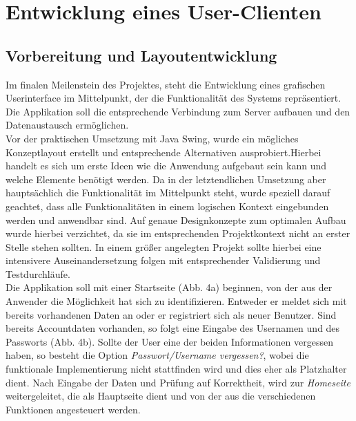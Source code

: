 

\section{Entwicklung eines User-Clienten}

\subsection{Vorbereitung und Layoutentwicklung}
Im finalen Meilenstein des Projektes, steht die Entwicklung eines grafischen Userinterface im Mittelpunkt, der die Funktionalität des Systems repräsentiert. Die Applikation soll die entsprechende Verbindung zum Server aufbauen und den Datenaustausch ermöglichen. \\

Vor der praktischen Umsetzung mit Java Swing, wurde ein mögliches Konzeptlayout erstellt und entsprechende Alternativen ausprobiert.Hierbei handelt es sich um erste Ideen wie die Anwendung aufgebaut sein kann und welche Elemente benötigt werden.
Da in der letztendlichen Umsetzung aber hauptsächlich die Funktionalität im Mittelpunkt steht, wurde speziell darauf geachtet, dass alle Funktionalitäten in einem logischen Kontext eingebunden werden und anwendbar sind. Auf genaue Designkonzepte zum optimalen Aufbau wurde hierbei verzichtet, da sie im entsprechenden Projektkontext nicht an erster Stelle stehen sollten. In einem größer angelegten Projekt sollte hierbei eine intensivere Auseinandersetzung folgen mit entsprechender Validierung und Testdurchläufe. \\

Die Applikation soll mit einer Startseite (Abb. 4a) beginnen, von der aus der Anwender die Möglichkeit hat sich zu identifizieren. Entweder er meldet sich mit bereits vorhandenen Daten an oder er registriert sich als neuer Benutzer.
Sind bereits Accountdaten vorhanden, so folgt eine Eingabe des Usernamen und des Passworts (Abb. 4b). Sollte der User eine der beiden Informationen vergessen haben, so besteht die Option \textit{Passwort/Username vergessen?}, wobei die funktionale Implementierung nicht stattfinden wird und dies eher als Platzhalter dient. Nach Eingabe der Daten und Prüfung auf Korrektheit, wird zur \textit{Homeseite} weitergeleitet, die als Hauptseite dient und von der aus die verschiedenen Funktionen angesteuert werden.

